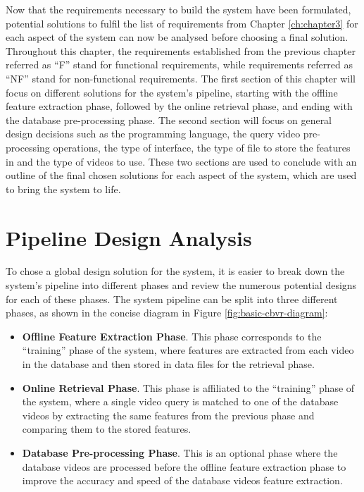 Now that the requirements necessary to build the system have been formulated, potential solutions to fulfil the list of requirements from Chapter \ref{ch:chapter3} for each aspect of the system can now be analysed before choosing a final solution. Throughout this chapter, the requirements established from the previous chapter referred as ``F'' stand for functional requirements, while requirements referred as ``NF'' stand for non-functional requirements. The first section of this chapter will focus on different solutions for the system's pipeline, starting with the offline feature extraction phase, followed by the online retrieval phase, and ending with the database pre-processing phase. The second section will focus on general design decisions such as the programming language, the query video pre-processing operations, the type of interface, the type of file to store the features in and the type of videos to use. These two sections are used to conclude with an outline of the final chosen solutions for each aspect of the system, which are used to bring the system to life.

\section{Pipeline Design Analysis}

To chose a global design solution for the system, it is easier to break down the system's pipeline into different phases and review the numerous potential designs for each of these phases. The system pipeline can be split into three different phases, as shown in the concise diagram in Figure \ref{fig:basic-cbvr-diagram}:

\begin{itemize}
    \item \textbf{Offline Feature Extraction Phase}. This phase corresponds to the ``training'' phase of the system, where features are extracted from each video in the database and then stored in data files for the retrieval phase.
    \item \textbf{Online Retrieval Phase}. This phase is affiliated to the ``training'' phase of the system, where a single video query is matched to one of the database videos by extracting the same features from the previous phase and comparing them to the stored features.
    \item \textbf{Database Pre-processing Phase}. This is an optional phase where the database videos are processed before the offline feature extraction phase to improve the accuracy and speed of the database videos feature extraction.
\end{itemize}

